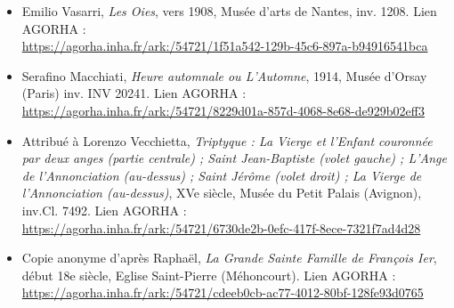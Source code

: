 \begin{itemize}
    \item Emilio Vasarri, \textit{Les Oies}, vers 1908, Musée d'arts de Nantes, inv. 1208. Lien AGORHA : \\ \url{https://agorha.inha.fr/ark:/54721/1f51a542-129b-45c6-897a-b94916541bca}
    \item Serafino Macchiati, \textit{Heure automnale ou L'Automne}, 1914, Musée d'Orsay (Paris) inv. INV 20241. Lien AGORHA : \\ \url{https://agorha.inha.fr/ark:/54721/8229d01a-857d-4068-8e68-de929b02eff3}
    \item Attribué à Lorenzo Vecchietta, \textit{Triptyque : La Vierge et l'Enfant couronnée par deux anges (partie centrale) ; Saint Jean-Baptiste (volet gauche) ; L'Ange de l'Annonciation (au-dessus) ; Saint Jérôme (volet droit) ; La Vierge de l'Annonciation (au-dessus)}, XVe siècle, Musée du Petit Palais (Avignon), inv.Cl. 7492. Lien AGORHA : \\ \url{https://agorha.inha.fr/ark:/54721/6730de2b-0efc-417f-8ece-7321f7ad4d28}
    \item Copie anonyme d'après Raphaël, \textit{La Grande Sainte Famille de François Ier}, début 18e siècle, Eglise Saint-Pierre (Méhoncourt). Lien AGORHA : \\ \url{https://agorha.inha.fr/ark:/54721/cdeeb0cb-ac77-4012-80bf-128fe93d0765}
\end{itemize}


